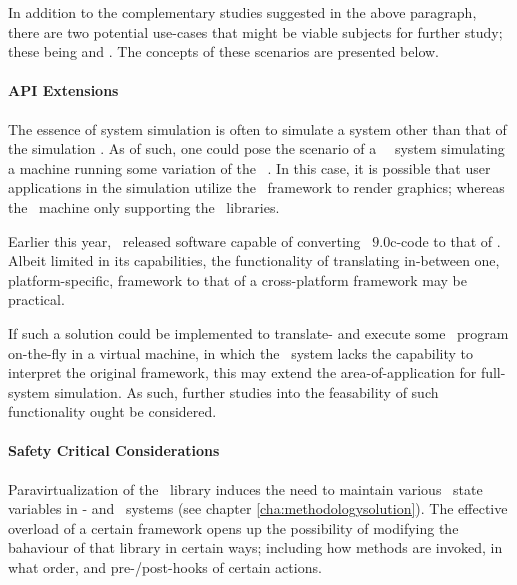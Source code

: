\noindent
In addition to the complementary studies suggested in the above paragraph, there are two potential use-cases that might be viable subjects for further study; these being  and .
The concepts of these scenarios are presented below.

\paragraph{API Extensions}
\label{par:futurework_apiextensions}
The essence of system simulation is often to simulate a system other than that of the simulation \dvttermhost .
As of such, one could pose the scenario of a \dvttermlinux\ \dvttermhost\ system simulating a machine running some variation of the \dvttermwindows\ \dvttermos .
In this case, it is possible that user applications in the simulation utilize the \dvttermdirectx\ framework to render graphics; whereas the \dvttermhost\ machine only supporting the \dvttermopengl\ libraries.

Earlier this year, \dvttermvalve\ released software capable of converting \dvttermdirectx\ $9.0$c-code to that of \dvttermopengl {}.
Albeit limited in its capabilities, the functionality of translating in-between one, platform-specific, framework to that of a cross-platform framework may be practical.

If such a solution could be implemented to translate- and execute some \dvttermtarget\ program on-the-fly in a virtual machine, in which the \dvttermhost\ system lacks the capability to interpret the original framework, this may extend the area-of-application for full-system simulation.
As such, further studies into the feasability of such functionality ought be considered.

\paragraph{Safety Critical Considerations}
\label{par:futurework_safetycriticalconsiderations}
Paravirtualization of the \dvttermopenglestwopointo\ library induces the need to maintain various \dvttermopengl\ state variables in \dvttermtarget - and \dvttermhost\ systems (see chapter \ref{cha:methodologysolution}).
The effective overload of a certain framework opens up the possibility of modifying the bahaviour of that library in certain ways; including how methods are invoked, in what order, and pre-/post-hooks of certain actions.


